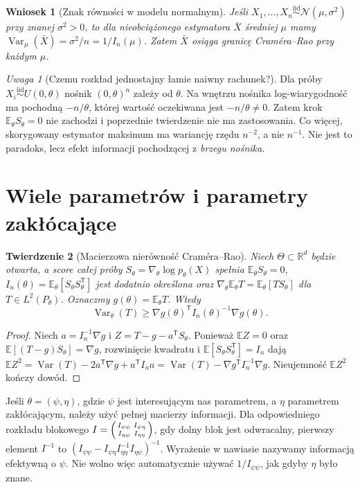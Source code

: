 \documentclass[11pt,a4paper,oneside]{report}
\numberwithin{equation}{chapter}
\theoremstyle{plain}
\newtheorem{twierdzenie}{Twierdzenie}[chapter]
\newtheorem{wniosek}[twierdzenie]{Wniosek}
\theoremstyle{definition}
\theoremstyle{remark}
\newtheorem{uwaga}{Uwaga}[chapter]
\newcommand{\R}{\mathbb R}
\newcommand{\E}{\mathbb E}
\newcommand{\Var}{\operatorname{Var}}
\newcommand{\Normal}{\mathcal N}
\newcommand{\iid}{\mathrel{\overset{\mathrm{iid}}\sim}}
\begin{document}
\begin{wniosek}[Znak równości w modelu normalnym]
Jeśli $X_1,\ldots,X_n\iid\Normal(\mu,\sigma^2)$ przy
znanej $\sigma^2>0$, to dla nieobciążonego estymatora
$\bar X$ średniej $\mu$ mamy
$\Var_\mu(\bar X)=\sigma^2/n=1/I_n(\mu)$.
Zatem $\bar X$ osiąga granicę Craméra--Rao przy każdym $\mu$.
\end{wniosek}

\begin{uwaga}[Czemu rozkład jednostajny łamie naiwny rachunek?]
Dla próby $X_i\iid U(0,\theta)$ nośnik $(0,\theta)^n$
zależy od $\theta$. Na wnętrzu nośnika log-wiarygodność ma
pochodną $-n/\theta$, której wartość oczekiwana jest
$-n/\theta\ne0$. Zatem krok $\E_\theta S_\theta=0$
nie zachodzi i poprzednie twierdzenie nie ma zastosowania.
Co więcej, skorygowany estymator maksimum ma wariancję rzędu
$n^{-2}$, a nie $n^{-1}$. Nie jest to paradoks, lecz efekt
informacji pochodzącej z \emph{brzegu nośnika}.
\end{uwaga}

\section{Wiele parametrów i parametry zakłócające}
\begin{twierdzenie}[Macierzowa nierówność Craméra--Rao]
\label{thm:cr-matrix}
Niech $\Theta\subset\R^d$ będzie otwarta, a score całej próby
$S_\theta=\nabla_\theta\log p_\theta(X)$ spełnia
$\E_\theta S_\theta=0$, $I_n(\theta)=\E_\theta[S_\theta
S_\theta^{\mathsf T}]$ jest dodatnio określona oraz
$\nabla_\theta\E_\theta T=\E_\theta[T S_\theta]$ dla
$T\in L^2(P_\theta)$. Oznaczmy $g(\theta)=\E_\theta T$.
Wtedy
\[
\Var_\theta(T)\ge \nabla g(\theta)^{\mathsf T}
I_n(\theta)^{-1}\nabla g(\theta).
\]
\end{twierdzenie}
\begin{proof}
Niech $a=I_n^{-1}\nabla g$ i $Z=T-g-a^{\mathsf T}S_\theta$.
Ponieważ $\E Z=0$ oraz $\E[(T-g)S_\theta]=\nabla g$,
rozwinięcie kwadratu i $\E[S_\theta S_\theta^{\mathsf T}]=I_n$
dają $\E Z^2=\Var(T)-2a^{\mathsf T}\nabla g+a^{\mathsf T}I_na
=\Var(T)-\nabla g^{\mathsf T}I_n^{-1}\nabla g$.
Nieujemność $\E Z^2$ kończy dowód.
\end{proof}

Jeśli $\theta=(\psi,\eta)$, gdzie $\psi$ jest interesującym
nas parametrem, a $\eta$ parametrem zakłócającym, należy użyć
pełnej macierzy informacji. Dla odpowiedniego rozkładu blokowego
$I=\begin{psmallmatrix}I_{\psi\psi}&I_{\psi\eta}\\
I_{\eta\psi}&I_{\eta\eta}\end{psmallmatrix}$, gdy dolny blok
jest odwracalny, pierwszy element $I^{-1}$ to
$(I_{\psi\psi}-I_{\psi\eta}I_{\eta\eta}^{-1}I_{\eta\psi})^{-1}$.
Wyrażenie w nawiasie nazywamy informacją efektywną o $\psi$.
Nie wolno więc automatycznie używać $1/I_{\psi\psi}$,
jak gdyby $\eta$ było znane.
\end{document}
